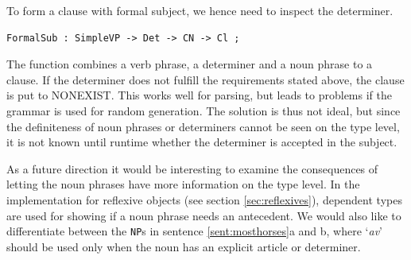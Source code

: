 \documentclass{report}
\begin{document}
To form a clause with formal subject, we hence need to inspect the determiner.
\begin{verbatim}
FormalSub : SimpleVP -> Det -> CN -> Cl ;
\end{verbatim}
The function combines a verb phrase, a determiner and a noun phrase to a clause.
If the determiner does not fulfill the requirements stated above, the clause is
put to NONEXIST.
This works well for parsing, but leads to problems if the grammar is used
for random generation. The solution is thus not ideal,
but since the definiteness of noun phrases or determiners cannot be seen on the
type level, it is not known until runtime whether the determiner is accepted
in the subject.

As a future direction it would be interesting to examine the consequences of
letting the noun phrases have more information on the type level. In the
implementation for reflexive objects  (see section \ref{sec:reflexives}),
dependent types are used for showing if a noun phrase 
needs an antecedent.
We would also like to differentiate between the \verb-NP-s in sentence
\ref{sent:mosthorses}a and b, where 
`\emph{av}' should be used
only when the noun has an explicit article or determiner.
\label{sent:mosthorses}



% 
\end{document}
